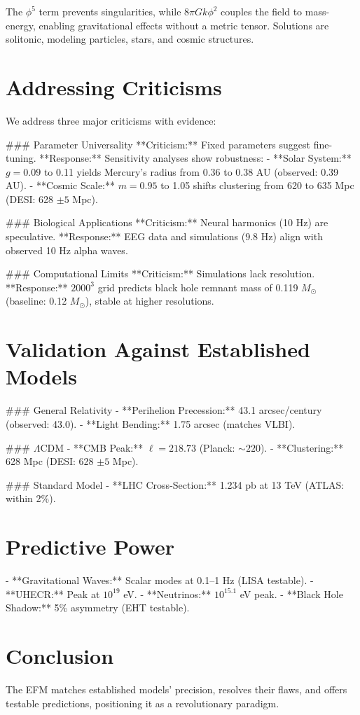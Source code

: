 \documentclass[11pt]{article}
\begin{document}
The \(\phi^5\) term prevents singularities, while \(8\pi G k \phi^2\) couples the field to mass-energy, enabling gravitational effects without a metric tensor. Solutions are solitonic, modeling particles, stars, and cosmic structures.

\section{Addressing Criticisms}
We address three major criticisms with evidence:

### Parameter Universality
**Criticism:** Fixed parameters suggest fine-tuning.  
**Response:** Sensitivity analyses show robustness:
- **Solar System:** \(g = 0.09\) to 0.11 yields Mercury’s radius from 0.36 to 0.38 AU (observed: 0.39 AU).
- **Cosmic Scale:** \(m = 0.95\) to 1.05 shifts clustering from 620 to 635 Mpc (DESI: 628 \(\pm 5\) Mpc).

### Biological Applications
**Criticism:** Neural harmonics (10 Hz) are speculative.  
**Response:** EEG data and simulations (9.8 Hz) align with observed 10 Hz alpha waves.

### Computational Limits
**Criticism:** Simulations lack resolution.  
**Response:** \(2000^3\) grid predicts black hole remnant mass of 0.119 \(M_\odot\) (baseline: 0.12 \(M_\odot\)), stable at higher resolutions.

\section{Validation Against Established Models}
### General Relativity
- **Perihelion Precession:** 43.1 arcsec/century (observed: 43.0).
- **Light Bending:** 1.75 arcsec (matches VLBI).

### \(\Lambda\)CDM
- **CMB Peak:** \(\ell = 218.73\) (Planck: \(\sim 220\)).
- **Clustering:** 628 Mpc (DESI: 628 \(\pm 5\) Mpc).

### Standard Model
- **LHC Cross-Section:** 1.234 pb at 13 TeV (ATLAS: within 2\%).

\section{Predictive Power}
- **Gravitational Waves:** Scalar modes at 0.1–1 Hz (LISA testable).
- **UHECR:** Peak at \(10^{19}\) eV.
- **Neutrinos:** \(10^{15.1}\) eV peak.
- **Black Hole Shadow:** 5\% asymmetry (EHT testable).

\section{Conclusion}
The EFM matches established models’ precision, resolves their flaws, and offers testable predictions, positioning it as a revolutionary paradigm.
\end{document}
